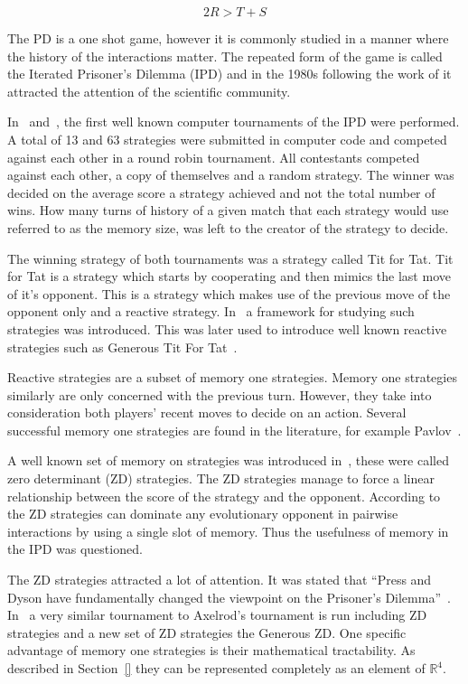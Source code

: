 \documentclass[10pt]{article}
\newcommand{\R}{\mathbb{R}}
\begin{document}
\begin{equation}\label{eq:pd_constrain_two}
    2R > T + S
\end{equation}

The PD is a one shot game, however it is commonly studied in a manner where the
history of the interactions matter. The repeated form of the game is called the
Iterated Prisoner's Dilemma (IPD) and in the 1980s following the work of
\cite{Axelrod1980a, Axelrod1980b} it attracted the attention of the scientific
community.

In~\cite{Axelrod1980a} and~\cite{Axelrod1980b}, the first well known computer
tournaments of the IPD were performed. A total of 13 and 63 strategies were submitted
in computer code and competed against each other in a round robin tournament.
All contestants competed against each other, a copy of themselves and a random strategy.
The winner was decided on the average score a strategy achieved and not the total number
of wins. How many turns of history of a given match that each strategy would use
referred to as the memory size, was left to the creator of the strategy to decide.

The winning strategy of both tournaments was a strategy called Tit for Tat. Tit for Tat
is a strategy which starts by cooperating and then mimics the last move of
it's opponent. This is a strategy which makes use of the previous move of the opponent
only and a reactive strategy. In~\cite{Nowak1989} a framework for
studying such strategies was introduced. This was later used to introduce well known
reactive strategies such as Generous Tit For Tat~\cite{Nowak1990}.

Reactive strategies are a subset of memory one strategies. Memory one strategies
similarly are only concerned with the previous turn. However, they take into consideration
both players' recent moves to decide on an action. Several successful memory one
strategies are found in the literature, for example Pavlov~\cite{Nowak1993}.

A well known set of memory on strategies was introduced in~\cite{Press2012},
these were called zero determinant (ZD) strategies. The ZD strategies manage to force a linear
relationship between the score of the strategy and the opponent. According to~\cite{Press2012}
the ZD strategies can dominate any evolutionary opponent in pairwise
interactions by using a single slot of memory. Thus the usefulness of memory in
the IPD was questioned.

The ZD strategies attracted a lot of attention. It was stated that
``Press and Dyson have fundamentally changed the viewpoint on the Prisoner's
Dilemma''~\cite{Stewart2012}. In~\cite{Stewart2012} a very similar tournament to Axelrod's
tournament is run including ZD strategies and a new set of ZD strategies the Generous
ZD. One specific advantage of memory one strategies is their mathematical tractability.
As described in Section~\ref{} %
they can be represented completely as an element of \(\R^{4}\).
\end{document}
